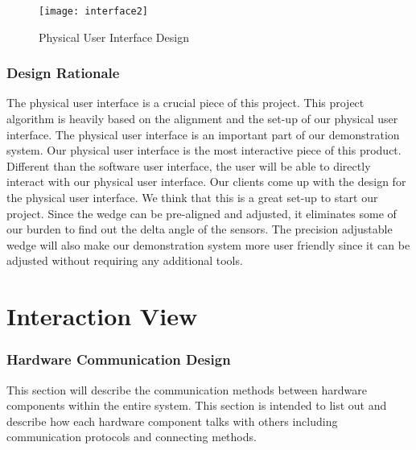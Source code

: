 			\begin{figure}
				\centering
			 		\caption{Physical User Interface Design \cite{IMU-figure}}			%
			      	\texttt{[image: interface2]}
			    \label{fig:interface2}
			\end{figure}

		\subsubsection{Design Rationale}
		The physical user interface is a crucial piece of this project. This project algorithm is heavily based on the alignment and the set-up of our physical user interface. The physical user interface is an important part of our demonstration system. Our physical user interface is the most interactive piece of this product. Different than the software user interface, the user will be able to directly interact with our physical user interface. Our clients come up with the design for the physical user interface. We think that this is a great set-up to start our project. Since the wedge can be pre-aligned and adjusted, it eliminates some of our burden to find out the delta angle of the sensors. The precision adjustable wedge will also make our demonstration system more user friendly since it can be adjusted without requiring any additional tools. 


\section{Interaction View}
	\subsubsection{Hardware Communication Design}
	This section will describe the communication methods between hardware components within the entire system. This section is intended to list out and describe how each hardware component talks with others including communication protocols and connecting methods.\\

